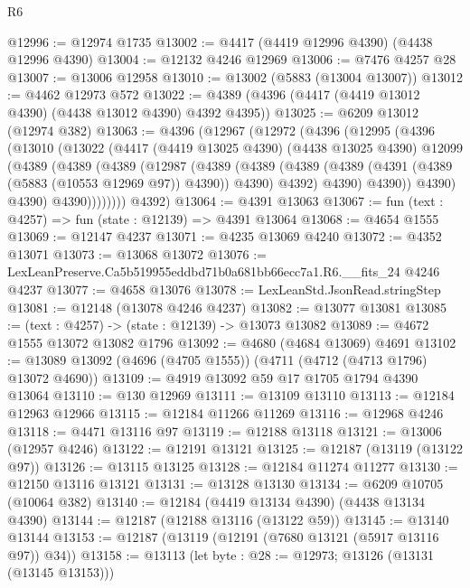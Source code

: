\begin{lexlean}{R6}
\begin{coremodule}
@12996 := @12974 @1735
@13002 := @4417 (@4419 @12996 @4390) (@4438 @12996 @4390)
@13004 := @12132 @4246 @12969
@13006 := @7476 @4257 @28
@13007 := @13006 @12958
@13010 := @13002 (@5883 (@13004 @13007))
@13012 := @4462 @12973 @572
@13022 := @4389 (@4396 (@4417 (@4419 @13012 @4390) (@4438 @13012 @4390) @4392 @4395))
@13025 := @6209 @13012 (@12974 @382)
@13063 := @4396
    (@12967
      (@12972
        (@4396
          (@12995
            (@4396
              (@13010
                (@13022
                  (@4417
                    (@4419 @13025 @4390)
                    (@4438 @13025 @4390)
                    @12099
                    (@4389
                      (@4389
                        (@4389
                          (@12987
                            (@4389
                              (@4389
                                (@4389
                                  (@4389 (@4391 (@4389 (@5883 (@10553 @12969 @97)) @4390)) @4390)
                                  @4392)
                                @4390)
                              @4390))
                          @4390)
                        @4390)
                      @4390))))))))
      @4392)
@13064 := @4391 @13063
@13067 := fun (text : @4257) => fun (state : @12139) => @4391 @13064
@13068 := @4654 @1555
@13069 := @12147 @4237
@13071 := @4235 @13069 @4240
@13072 := @4352 @13071
@13073 := @13068 @13072
@13076 := LexLeanPreserve.Ca5b519955eddbd71b0a681bb66ecc7a1.R6.__fits_24 @4246 @4237
@13077 := @4658 @13076
@13078 := LexLeanStd.JsonRead.stringStep
@13081 := @12148 (@13078 @4246 @4237)
@13082 := @13077 @13081
@13085 := (text : @4257) -> (state : @12139) -> @13073 @13082
@13089 := @4672 @1555 @13072 @13082 @1796
@13092 := @4680 (@4684 @13069) @4691
@13102 := @13089 @13092 (@4696 (@4705 @1555)) (@4711 (@4712 (@4713 @1796) @13072 @4690))
@13109 := @4919 @13092 @59 @17 @1705 @1794 @4390 @13064
@13110 := @130 @12969
@13111 := @13109 @13110
@13113 := @12184 @12963 @12966
@13115 := @12184 @11266 @11269
@13116 := @12968 @4246
@13118 := @4471 @13116 @97
@13119 := @12188 @13118
@13121 := @13006 (@12957 @4246)
@13122 := @12191 @13121
@13125 := @12187 (@13119 (@13122 @97))
@13126 := @13115 @13125
@13128 := @12184 @11274 @11277
@13130 := @12150 @13116 @13121
@13131 := @13128 @13130
@13134 := @6209 @10705 (@10064 @382)
@13140 := @12184 (@4419 @13134 @4390) (@4438 @13134 @4390)
@13144 := @12187 (@12188 @13116 (@13122 @59))
@13145 := @13140 @13144
@13153 := @12187 (@13119 (@12191 (@7680 @13121 (@5917 @13116 @97)) @34))
@13158 := @13113 (let byte : @28 := @12973; @13126 (@13131 (@13145 @13153)))

\end{coremodule}
\end{lexlean}
